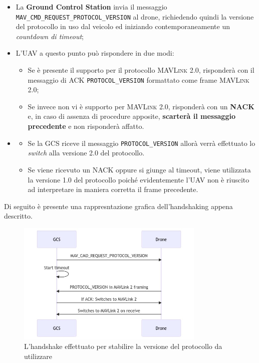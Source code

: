 \documentclass[a4paper, 12pt, oneside]{article}
\theoremstyle{definition}
\begin{document}
\begin{itemize}
    \item La \textbf{Ground Control Station} invia il messaggio \texttt{MAV\_CMD\_REQUEST\_PROTOCOL\_VERSION} al drone, richiedendo quindi la versione del protocollo in uso dal veicolo ed iniziando contemporaneamente un \textit{countdown di timeout};
    \item L'UAV a questo punto può rispondere in due modi: \begin{itemize}
        \item Se è presente il supporto per il protocollo \textsc{MAVLink} 2.0, risponderà con il messaggio di ACK \texttt{PROTOCOL\_VERSION} formattato come frame \textsc{MAVLink} 2.0;
        \item Se invece non vi è supporto per \textsc{MAVLink} 2.0, risponderà con un \textbf{NACK} e, in caso di assenza di procedure apposite, \textbf{scarterà il messaggio precedente} e non risponderà affatto.
    \end{itemize}
    \item \begin{itemize}
        \item Se la GCS riceve il messaggio \texttt{PROTOCOL\_VERSION} allorà verrà effettuato lo \textit{switch} alla versione 2.0 del protocollo.
        \item Se viene ricevuto un NACK oppure si giunge al timeout, viene utilizzata la versione 1.0 del protocollo poiché evidentemente l'UAV non è riuscito ad interpretare in maniera corretta il frame precedente.
        \end{itemize} 
\end{itemize}

\newpage

Di seguito è presente una rappresntazione grafica dell'handshaking appena descritto.

\begin{figure}[H]
    \centering
    \includegraphics[width=0.8\textwidth]{images/handshake_mavlink.jpeg}
    \caption{L'handshake effettuato per stabilire la versione del protocollo da utilizzare}
\end{figure}
\end{document}
